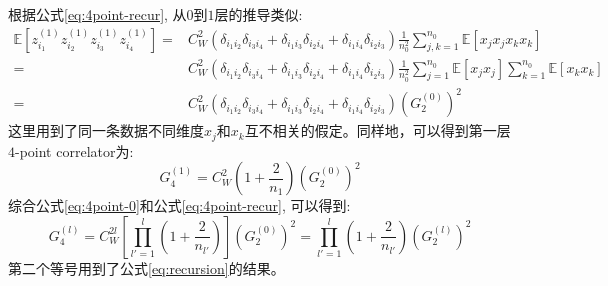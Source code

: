 根据公式\ref{eq:4point-recur}, 从$0$到$1$层的推导类似:
\begin{equation*}
    \begin{aligned}
     \mathbb{E}[z_{i_1}^{(1)}z_{i_2}^{(1)}z_{i_3}^{(1)}z_{i_4}^{(1)}]
    =& C_W^2 (\delta_{i_1i_2}\delta_{i_3i_4} + \delta_{i_1i_3}\delta_{i_2i_4} 
            + \delta_{i_1i_4}\delta_{i_2i_3}) \frac{1}{n_0^2} 
            \sum_{j,k=1}^{n_0} \mathbb{E}[x_jx_jx_kx_k] \\
    =& C_W^2 (\delta_{i_1i_2}\delta_{i_3i_4} + \delta_{i_1i_3}\delta_{i_2i_4} 
            + \delta_{i_1i_4}\delta_{i_2i_3}) \frac{1}{n_0^2} 
            \sum_{j=1}^{n_0} \mathbb{E}[x_jx_j] \sum_{k=1}^{n_0} \mathbb{E}[x_k x_k] \\
    =&  C_W^2 (\delta_{i_1i_2}\delta_{i_3i_4} + \delta_{i_1i_3}\delta_{i_2i_4} 
            + \delta_{i_1i_4}\delta_{i_2i_3}) (G_2^{(0)})^2
    \end{aligned}
\end{equation*}
这里用到了同一条数据不同维度$x_j$和$x_k$互不相关的假定。同样地，可以得到第一层$4$-point correlator为:
\begin{equation}
    G_4^{(1)} = C_W^2 (1+ \frac{2}{n_1}) (G_2^{(0)})^2
    \label{eq:4point-0}
\end{equation}
综合公式\ref{eq:4point-0}和公式\ref{eq:4point-recur}, 可以得到:
\begin{equation}
    G_4^{(l)} = C_W^{2l}[\prod_{l'=1}^l(1+\frac{2}{n_{l'}})](G_2^{(0)})^2
        = \prod_{l'=1}^l(1+\frac{2}{n_{l'}})(G_2^{(l)})^2
\end{equation}
第二个等号用到了公式\ref{eq:recursion}的结果。

